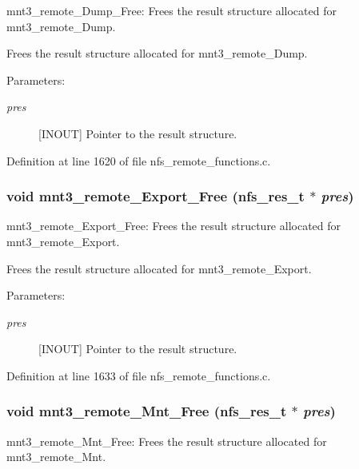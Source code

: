 mnt3\_\-remote\_\-Dump\_\-Free: Frees the result structure allocated for mnt3\_\-remote\_\-Dump.

Frees the result structure allocated for mnt3\_\-remote\_\-Dump.

\begin{Desc}
\item[Parameters:]
\begin{description}
\item[{\em pres}][INOUT] Pointer to the result structure. \end{description}
\end{Desc}


Definition at line 1620 of file nfs\_\-remote\_\-functions.c.
\subsubsection{\setlength{\rightskip}{0pt plus 5cm}void mnt3\_\-remote\_\-Export\_\-Free (nfs\_\-res\_\-t $\ast$ {\em pres})}\label{group__NFSprocs_ga50}


mnt3\_\-remote\_\-Export\_\-Free: Frees the result structure allocated for mnt3\_\-remote\_\-Export.

Frees the result structure allocated for mnt3\_\-remote\_\-Export.

\begin{Desc}
\item[Parameters:]
\begin{description}
\item[{\em pres}][INOUT] Pointer to the result structure. \end{description}
\end{Desc}


Definition at line 1633 of file nfs\_\-remote\_\-functions.c.
\subsubsection{\setlength{\rightskip}{0pt plus 5cm}void mnt3\_\-remote\_\-Mnt\_\-Free (nfs\_\-res\_\-t $\ast$ {\em pres})}\label{group__NFSprocs_ga48}


mnt3\_\-remote\_\-Mnt\_\-Free: Frees the result structure allocated for mnt3\_\-remote\_\-Mnt.


